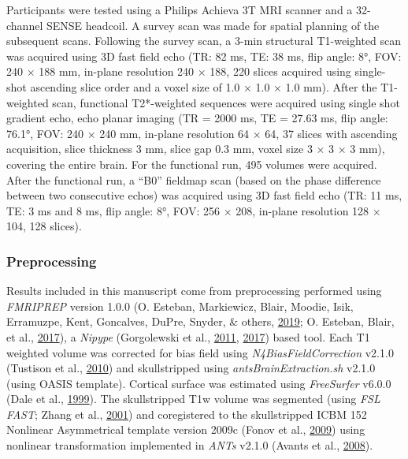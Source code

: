 \documentclass[11pt,american,a4paper,oneside,]{memoir} %
\begin{document}
Participants were tested using a Philips Achieva 3T MRI scanner and a 32-channel SENSE headcoil. A survey scan was made for spatial planning of the subsequent scans. Following the survey scan, a 3-min structural T1-weighted scan was acquired using 3D fast field echo (TR: 82 ms, TE: 38 ms, flip angle: 8°, FOV: 240 × 188 mm, in-plane resolution 240 × 188, 220 slices acquired using single-shot ascending slice order and a voxel size of 1.0 × 1.0 × 1.0 mm). After the T1-weighted scan, functional T2*-weighted sequences were acquired using single shot gradient echo, echo planar imaging (TR = 2000 ms, TE = 27.63 ms, flip angle: 76.1°, FOV: 240 × 240 mm, in-plane resolution 64 × 64, 37 slices with ascending acquisition, slice thickness 3 mm, slice gap 0.3 mm, voxel size 3 × 3 × 3 mm), covering the entire brain. For the functional run, 495 volumes were acquired. After the functional run, a ``B0'' fieldmap scan (based on the phase difference between two consecutive echos) was acquired using 3D fast field echo (TR: 11 ms, TE: 3 ms and 8 ms, flip angle: 8°, FOV: 256 × 208, in-plane resolution 128 × 104, 128 slices).

\hypertarget{morbid-curiosity-methods-imaging-details-preprocessing}{%
\subsubsection{Preprocessing}\label{morbid-curiosity-methods-imaging-details-preprocessing}}

Results included in this manuscript come from preprocessing performed using \emph{FMRIPREP} version 1.0.0 (O. Esteban, Markiewicz, Blair, Moodie, Isik, Erramuzpe, Kent, Goncalves, DuPre, Snyder, \& others, \protect\hyperlink{ref-esteban2019fmriprep}{2019}; O. Esteban, Blair, et al., \protect\hyperlink{ref-esteban_oscar_2017_1095198}{2017}), a \emph{Nipype} (Gorgolewski et al., \protect\hyperlink{ref-Gorgolewski2011-aa}{2011}, \protect\hyperlink{ref-gorgolewski_krzysztof_j_2017_581704}{2017}) based tool. Each T1 weighted volume was corrected for bias field using \emph{N4BiasFieldCorrection} v2.1.0 (Tustison et al., \protect\hyperlink{ref-Tustison2010-tk}{2010}) and skullstripped using \emph{antsBrainExtraction.sh} v2.1.0 (using OASIS template). Cortical surface was estimated using \emph{FreeSurfer} v6.0.0 (Dale et al., \protect\hyperlink{ref-Dale1999-rk}{1999}). The skullstripped T1w volume was segmented (using \emph{FSL FAST}; Zhang et al., \protect\hyperlink{ref-Zhang2001-wa}{2001}) and coregistered to the skullstripped ICBM 152 Nonlinear Asymmetrical template version 2009c (Fonov et al., \protect\hyperlink{ref-Fonov2009-sr}{2009}) using nonlinear transformation implemented in \emph{ANTs} v2.1.0 (Avants et al., \protect\hyperlink{ref-Avants2008-bv}{2008}).
\end{document}
